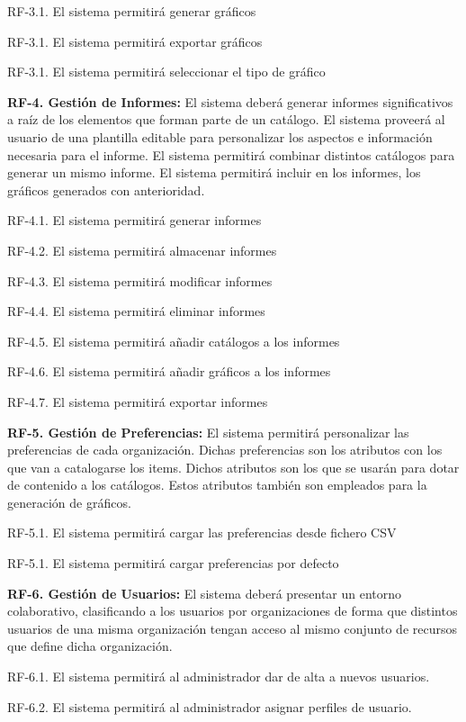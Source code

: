 \documentclass[a4paper,11pt]{book}
\begin{document}
	RF-3.1. El sistema permitirá generar gráficos
	
	RF-3.1. El sistema permitirá exportar gráficos
	
	RF-3.1. El sistema permitirá seleccionar el tipo de gráfico	


	 
\textbf{RF-4. Gestión de Informes:} El sistema deberá generar informes significativos a raíz de los elementos que forman parte de un catálogo. El sistema proveerá al usuario de una plantilla editable para personalizar los aspectos e información necesaria para el informe. El sistema permitirá combinar distintos catálogos para generar un mismo informe.  El sistema permitirá incluir en los informes, los gráficos generados con anterioridad. 

	

	RF-4.1. El sistema permitirá generar informes
	
	RF-4.2. El sistema permitirá almacenar informes
	
	RF-4.3. El sistema permitirá modificar informes
	
	RF-4.4. El sistema permitirá eliminar informes
	
	RF-4.5. El sistema permitirá añadir catálogos a los informes
	
	RF-4.6. El sistema permitirá añadir gráficos a los informes
	
	RF-4.7. El sistema permitirá exportar informes
	

\textbf{RF-5. Gestión de Preferencias:} El sistema permitirá personalizar las preferencias de cada organización. Dichas preferencias son los atributos con los que van a catalogarse los items. Dichos atributos son los que se usarán para dotar de contenido a los catálogos. Estos atributos también son empleados para la generación de gráficos. 


	RF-5.1. El sistema permitirá cargar las preferencias desde fichero CSV
	
	RF-5.1. El sistema permitirá cargar preferencias por defecto 
	
	

\textbf{RF-6. Gestión de Usuarios:} El sistema deberá presentar un entorno colaborativo, clasificando a los usuarios por organizaciones de forma que distintos usuarios de una misma organización tengan acceso al mismo conjunto de recursos que define dicha organización. 


	RF-6.1. El sistema permitirá al administrador dar de alta a nuevos usuarios.
	
	RF-6.2. El sistema permitirá al administrador asignar perfiles de usuario.
	
\end{document}
